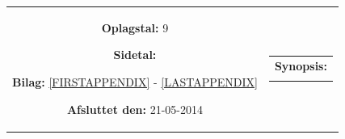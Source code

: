 \begin{titlepage}
\begin{nopagebreak}
{\begin{tabular}{cc}
{\begin{description}
						\item {\bf Oplagstal:} 9
						\item {\bf Sidetal:} \numpages
						\item {\bf Bilag:} \ref{FIRSTAPPENDIX} - \ref{LASTAPPENDIX}
						\item {\bf Afsluttet den:} 21-05-2014
					\end{description}
					\vfill
				} &
				\parbox{7cm}{
					\vspace{.15cm}
					\hfill 
					\begin{tabular}{l}
						{\bf Synopsis:}\bigskip \\
						\fbox{
							\parbox{6.5cm}{\smallskip
								{\vfill{\small 
								\smallskip}}
							}
						}
  					\end{tabular}
  				}
			\end{tabular}
		}\\
		\\
	\end{nopagebreak}
\end{titlepage}